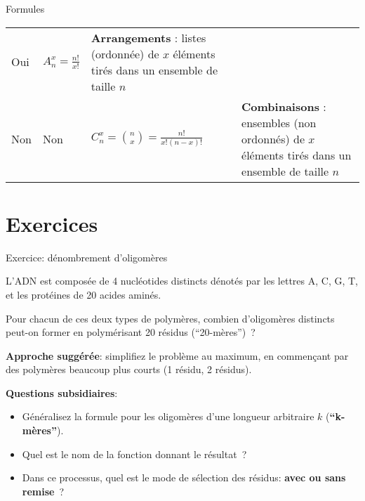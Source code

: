 \documentclass[ignorenonframetext,]{beamer}
\providecommand{\tightlist}{%
  \setlength{\itemsep}{0pt}\setlength{\parskip}{0pt}}
\begin{document}
\begin{frame}{Formules}
\begin{longtable}[]{@{}llll@{}}
\begin{minipage}[t]{0.10\columnwidth}
Oui\strut
\end{minipage} & \begin{minipage}[t]{0.16\columnwidth}\raggedright\strut
\(A^x_n = \frac{n!}{x!}\)\strut
\end{minipage} & \begin{minipage}[t]{0.42\columnwidth}\raggedright\strut
\textbf{Arrangements} : listes (ordonnée) de \(x\) éléments tirés dans
un ensemble de taille \(n\)\strut
\end{minipage}\tabularnewline
\begin{minipage}[t]{0.11\columnwidth}\raggedright\strut
Non\strut
\end{minipage} & \begin{minipage}[t]{0.10\columnwidth}\raggedright\strut
Non\strut
\end{minipage} & \begin{minipage}[t]{0.16\columnwidth}\raggedright\strut
\(C^x_n = \binom{n}{x} = \frac{n!}{x! (n - x) !}\)\strut
\end{minipage} & \begin{minipage}[t]{0.42\columnwidth}\raggedright\strut
\textbf{Combinaisons} : ensembles (non ordonnés) de \(x\) éléments tirés
dans un ensemble de taille \(n\)\strut
\end{minipage}\tabularnewline
\bottomrule
\end{longtable}

\end{frame}

\section{Exercices}\label{exercices}

\begin{frame}{Exercice: dénombrement d'oligomères}

L'ADN est composée de 4 nucléotides distincts dénotés par les lettres A,
C, G, T, et les protéines de 20 acides aminés.

Pour chacun de ces deux types de polymères, combien d'oligomères
distincts peut-on former en polymérisant 20 résidus (``20-mères'')~?

\textbf{Approche suggérée}: simplifiez le problème au maximum, en
commençant par des polymères beaucoup plus courts (1 résidu, 2 résidus).

\textbf{Questions subsidiaires}:

\begin{itemize}
\tightlist
\item
  Généralisez la formule pour les oligomères d'une longueur arbitraire
  \(k\) (\textbf{``k-mères''}).
\item
  Quel est le nom de la fonction donnant le résultat~?
\item
  Dans ce processus, quel est le mode de sélection des résidus:
  \textbf{avec ou sans remise}~?
\end{itemize}

\end{frame}
\end{document}
